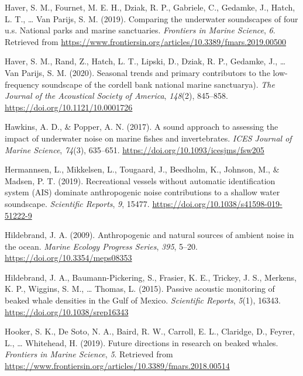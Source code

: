 \documentclass[
]{article}
\newlength{\cslhangindent}
\newlength{\cslentryspacingunit} %
\newenvironment{CSLReferences}[2] %
 {%
  \setlength{\parindent}{0pt}
  \ifodd #1
  \let\oldpar\par
  \def\par{\hangindent=\cslhangindent\oldpar}
  \fi
  \setlength{\parskip}{#2\cslentryspacingunit}
 }%
 {}
\begin{document}
\begin{CSLReferences}{1}{0}
\leavevmode{}%
Haver, S. M., Fournet, M. E. H., Dziak, R. P., Gabriele, C., Gedamke,
J., Hatch, L. T., \ldots{} Van Parijs, S. M. (2019). Comparing the
underwater soundscapes of four u.s. National parks and marine
sanctuaries. \emph{Frontiers in Marine Science}, \emph{6}. Retrieved
from \url{https://www.frontiersin.org/articles/10.3389/fmars.2019.00500}

\leavevmode{}%
Haver, S. M., Rand, Z., Hatch, L. T., Lipski, D., Dziak, R. P., Gedamke,
J., \ldots{} Van Parijs, S. M. (2020). Seasonal trends and primary
contributors to the low-frequency soundscape of the cordell bank
national marine sanctuarya). \emph{The Journal of the Acoustical Society
of America}, \emph{148}(2), 845--858.
\url{https://doi.org/10.1121/10.0001726}

\leavevmode{}%
Hawkins, A. D., \& Popper, A. N. (2017). A sound approach to assessing
the impact of underwater noise on marine fishes and invertebrates.
\emph{ICES Journal of Marine Science}, \emph{74}(3), 635--651.
\url{https://doi.org/10.1093/icesjms/fsw205}

\leavevmode{}%
Hermannsen, L., Mikkelsen, L., Tougaard, J., Beedholm, K., Johnson, M.,
\& Madsen, P. T. (2019). Recreational vessels without automatic
identification system (AIS) dominate anthropogenic noise contributions
to a shallow water soundscape. \emph{Scientific Reports}, \emph{9},
15477. \url{https://doi.org/10.1038/s41598-019-51222-9}

\leavevmode{}%
Hildebrand, J. A. (2009). Anthropogenic and natural sources of ambient
noise in the ocean. \emph{Marine Ecology Progress Series}, \emph{395},
5--20. \url{https://doi.org/10.3354/meps08353}

\leavevmode{}%
Hildebrand, J. A., Baumann-Pickering, S., Frasier, K. E., Trickey, J.
S., Merkens, K. P., Wiggins, S. M., \ldots{} Thomas, L. (2015). Passive
acoustic monitoring of beaked whale densities in the Gulf of Mexico.
\emph{Scientific Reports}, \emph{5}(1), 16343.
\url{https://doi.org/10.1038/srep16343}

\leavevmode{}%
Hooker, S. K., De Soto, N. A., Baird, R. W., Carroll, E. L., Claridge,
D., Feyrer, L., \ldots{} Whitehead, H. (2019). Future directions in
research on beaked whales. \emph{Frontiers in Marine Science}, \emph{5}.
Retrieved from
\url{https://www.frontiersin.org/articles/10.3389/fmars.2018.00514}


\end{CSLReferences}
\end{document}
